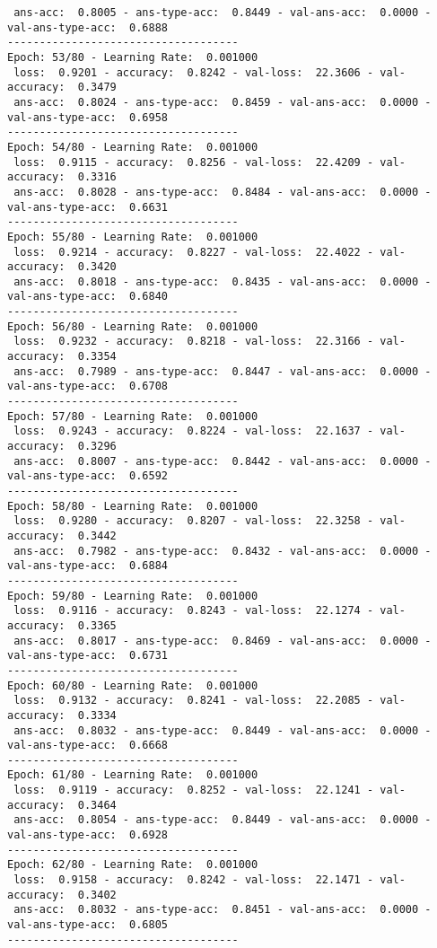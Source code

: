 \documentclass{report}
\begin{document}
\begin{verbatim}
 ans-acc:  0.8005 - ans-type-acc:  0.8449 - val-ans-acc:  0.0000 - val-ans-type-acc:  0.6888
------------------------------------
Epoch: 53/80 - Learning Rate:  0.001000
 loss:  0.9201 - accuracy:  0.8242 - val-loss:  22.3606 - val-accuracy:  0.3479
 ans-acc:  0.8024 - ans-type-acc:  0.8459 - val-ans-acc:  0.0000 - val-ans-type-acc:  0.6958
------------------------------------
Epoch: 54/80 - Learning Rate:  0.001000
 loss:  0.9115 - accuracy:  0.8256 - val-loss:  22.4209 - val-accuracy:  0.3316
 ans-acc:  0.8028 - ans-type-acc:  0.8484 - val-ans-acc:  0.0000 - val-ans-type-acc:  0.6631
------------------------------------
Epoch: 55/80 - Learning Rate:  0.001000
 loss:  0.9214 - accuracy:  0.8227 - val-loss:  22.4022 - val-accuracy:  0.3420
 ans-acc:  0.8018 - ans-type-acc:  0.8435 - val-ans-acc:  0.0000 - val-ans-type-acc:  0.6840
------------------------------------
Epoch: 56/80 - Learning Rate:  0.001000
 loss:  0.9232 - accuracy:  0.8218 - val-loss:  22.3166 - val-accuracy:  0.3354
 ans-acc:  0.7989 - ans-type-acc:  0.8447 - val-ans-acc:  0.0000 - val-ans-type-acc:  0.6708
------------------------------------
Epoch: 57/80 - Learning Rate:  0.001000
 loss:  0.9243 - accuracy:  0.8224 - val-loss:  22.1637 - val-accuracy:  0.3296
 ans-acc:  0.8007 - ans-type-acc:  0.8442 - val-ans-acc:  0.0000 - val-ans-type-acc:  0.6592
------------------------------------
Epoch: 58/80 - Learning Rate:  0.001000
 loss:  0.9280 - accuracy:  0.8207 - val-loss:  22.3258 - val-accuracy:  0.3442
 ans-acc:  0.7982 - ans-type-acc:  0.8432 - val-ans-acc:  0.0000 - val-ans-type-acc:  0.6884
------------------------------------
Epoch: 59/80 - Learning Rate:  0.001000
 loss:  0.9116 - accuracy:  0.8243 - val-loss:  22.1274 - val-accuracy:  0.3365
 ans-acc:  0.8017 - ans-type-acc:  0.8469 - val-ans-acc:  0.0000 - val-ans-type-acc:  0.6731
------------------------------------
Epoch: 60/80 - Learning Rate:  0.001000
 loss:  0.9132 - accuracy:  0.8241 - val-loss:  22.2085 - val-accuracy:  0.3334
 ans-acc:  0.8032 - ans-type-acc:  0.8449 - val-ans-acc:  0.0000 - val-ans-type-acc:  0.6668
------------------------------------
Epoch: 61/80 - Learning Rate:  0.001000
 loss:  0.9119 - accuracy:  0.8252 - val-loss:  22.1241 - val-accuracy:  0.3464
 ans-acc:  0.8054 - ans-type-acc:  0.8449 - val-ans-acc:  0.0000 - val-ans-type-acc:  0.6928
------------------------------------
Epoch: 62/80 - Learning Rate:  0.001000
 loss:  0.9158 - accuracy:  0.8242 - val-loss:  22.1471 - val-accuracy:  0.3402
 ans-acc:  0.8032 - ans-type-acc:  0.8451 - val-ans-acc:  0.0000 - val-ans-type-acc:  0.6805
------------------------------------

\end{verbatim}
\end{document}
